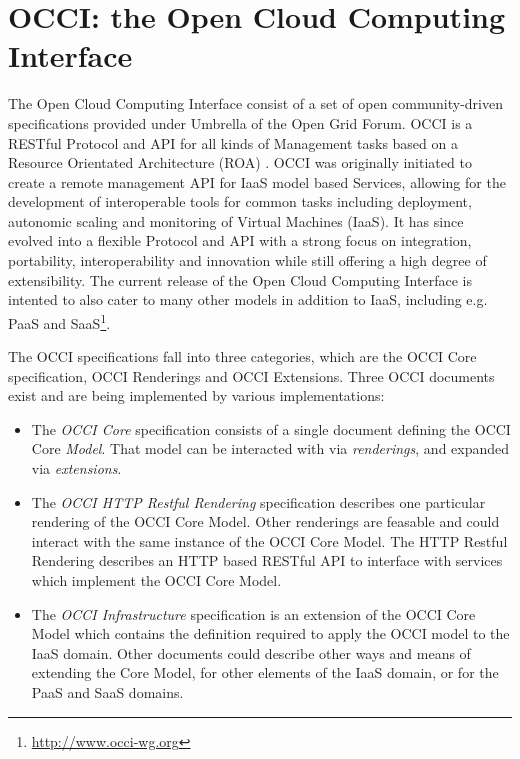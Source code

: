 \documentclass[10pt,conference,final,letterpaper,twoside,twocolumn,]{IEEEtran}
\newcommand{\I}[1]{\textit{#1}}
\begin{document}
\section{OCCI: the Open Cloud Computing Interface}
\label{sec:occi}

The Open Cloud Computing Interface consist of a set of open
community-driven specifications provided under Umbrella of the Open
Grid Forum. OCCI is a RESTful \cite{REST_Fielding} Protocol and API
for all kinds of Management tasks based on a Resource Orientated
Architecture (ROA) \cite{RR2007}. OCCI was originally initiated to
create a remote management API for IaaS model based Services, allowing
for the development of interoperable tools for common tasks including
deployment, autonomic scaling and monitoring of Virtual Machines
(IaaS). It has since evolved into a flexible Protocol and API with a
strong focus on integration, portability, interoperability and
innovation while still offering a high degree of extensibility. The
current release of the Open Cloud Computing Interface is intented to
also cater to many other models in addition to IaaS, including
e.g. PaaS and SaaS\footnote{\url{http://www.occi-wg.org}}.

The OCCI specifications fall into three categories, which are the OCCI
Core specification, OCCI Renderings and OCCI Extensions.  Three OCCI
documents exist and are being implemented by various implementations:
 
\begin{itemize}
  \item The \I{OCCI Core} specification consists of a single document
    defining the OCCI Core \I{Model}. That model can be interacted
    with via \I{renderings}, and expanded via \I{extensions}.

  \item The \I{OCCI HTTP Restful Rendering} specification describes
    one particular rendering of the OCCI Core Model. Other renderings
    are feasable and could interact with the same instance of the OCCI
    Core Model.  The HTTP Restful Rendering describes an HTTP based
    RESTful API to interface with services which implement the OCCI
    Core Model.
 
  \item The \I{OCCI Infrastructure} specification is an extension of
    the OCCI Core Model which contains the definition required to
    apply the OCCI model to the IaaS domain. Other documents could
    describe other ways and means of extending the Core Model, for
    other elements of the IaaS domain, or for the PaaS and SaaS
    domains.
 \end{itemize}
\end{document}

